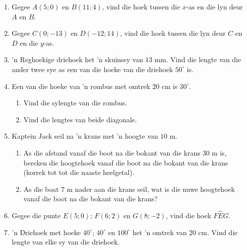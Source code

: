 \begin{eocexercises}{}
\begin{enumerate}[itemsep=6pt, label=\textbf{\arabic*}. ]
\item Gegee $A(5;0)$ en $B(11;4)$, vind die hoek tussen die $x$-as en die lyn deur $A$ en $B$. 
\item Gegee $C(0;-13)$ en $D(-12;14)$, vind die hoek tussen die lyn deur $C$ en $D$ en die $y$-as. 


\item 'n Reghoekige driehoek het 'n skuinssy van $13$ mm. Vind die lengte van die ander twee sye as een van die hoeke van die driehoek $50^{\circ}$ is.
\item Een van die hoeke van 'n rombus met omtrek $20$ cm is $30^{\circ}$. 
\begin{enumerate}[noitemsep, label=\textbf{(\alph*)} ]
\item Vind die sylengte van die rombus. 
\item Vind die lengtes van beide diagonale. 
\end{enumerate} 
\item Kaptein Jack seil na 'n krans met 'n hoogte van $10$ m. 
\begin{enumerate}[noitemsep, label=\textbf{(\alph*)} ] 
\item As die afstand vanaf die boot na die bokant van die krans $30$ m is, bereken die hoogtehoek vanaf die boot na die bokant van die krans (korrek tot tot die naaste heelgetal).
\item As die boat $7$ m nader aan die krans seil, wat is die nuwe hoogtehoek vanaf die boot na die bokant van die krans? 
\end{enumerate} 
\item Gegee die punte $E(5;0)$; $F(6;2)$ en $G(8;-2)$, vind die hoek $F\hat{E}G$. 
\item  'n Driehoek met hoeke $40^{\circ}$; $40^{\circ}$ en $100^{\circ}$ het 'n omtrek van $20$ cm. Vind die lengte van elke sy  van die driehoek. 

\end{enumerate}

\end{eocexercises}


